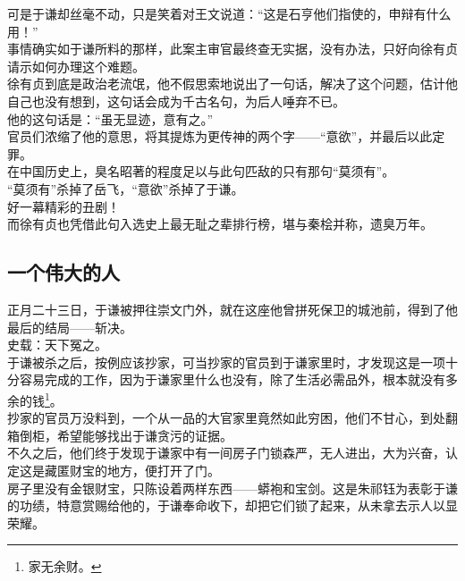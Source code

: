 \begin{multicols}{\theparacolNo}
可是于谦却丝毫不动，只是笑着对王文说道：“这是石亨他们指使的，申辩有什么用！”\\

事情确实如于谦所料的那样，此案主审官最终查无实据，没有办法，只好向徐有贞请示如何办理这个难题。\\

徐有贞到底是政治老流氓，他不假思索地说出了一句话，解决了这个问题，估计他自己也没有想到，这句话会成为千古名句，为后人唾弃不已。\\

他的这句话是：“虽无显迹，意有之。”\\

官员们浓缩了他的意思，将其提炼为更传神的两个字——“意欲”，并最后以此定罪。\\

在中国历史上，臭名昭著的程度足以与此句匹敌的只有那句“莫须有”。\\

“莫须有”杀掉了岳飞，“意欲”杀掉了于谦。\\

好一幕精彩的丑剧！\\

而徐有贞也凭借此句入选史上最无耻之辈排行榜，堪与秦桧并称，遗臭万年。\\

\subsection{一个伟大的人}
正月二十三日，于谦被押往崇文门外，就在这座他曾拼死保卫的城池前，得到了他最后的结局——斩决。\\

史载：天下冤之。\\

于谦被杀之后，按例应该抄家，可当抄家的官员到于谦家里时，才发现这是一项十分容易完成的工作，因为于谦家里什么也没有，除了生活必需品外，根本就没有多余的钱\footnote{家无余财。}。\\

抄家的官员万没料到，一个从一品的大官家里竟然如此穷困，他们不甘心，到处翻箱倒柜，希望能够找出于谦贪污的证据。\\

不久之后，他们终于发现于谦家中有一间房子门锁森严，无人进出，大为兴奋，认定这是藏匿财宝的地方，便打开了门。\\

房子里没有金银财宝，只陈设着两样东西——蟒袍和宝剑。这是朱祁钰为表彰于谦的功绩，特意赏赐给他的，于谦奉命收下，却把它们锁了起来，从未拿去示人以显荣耀。\\


\end{multicols}
